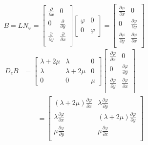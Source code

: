 \documentclass[12pt]{article}
\begin{document}
\begin{equation}		\label{eq46a}
B=LN_{\varphi}= \left[
\begin{array}{cc}
\frac{\partial}{\partial x} & 0   			\\
0 &\frac{\partial}{\partial y} 				\\
\frac{\partial}{\partial y} & \frac{\partial}{\partial x}   			\\
\end{array}
\right]
%
\left[
\begin{array}{cc}
\varphi & 0  			\\
0 &\varphi   				
\end{array}
\right]
=
 \left[
\begin{array}{cc}
\frac{\partial \varphi}{\partial x} & 0   			\\
0 &\frac{\partial \varphi}{\partial y} 				\\
\frac{\partial \varphi}{\partial y} & \frac{\partial \varphi}{\partial x}   			\\
\end{array}
\right]
\end{equation}
%
\begin{equation}	\label{eq47a}
\begin{split}
D_eB& = \left[
\begin{array}{ccc}
\lambda+2\mu & \lambda & 0 			\\
\lambda & \lambda+2\mu & 0 			\\
0 & 0 & \mu 		
\end{array}
\right]
%
 \left[
\begin{array}{cc}
\frac{\partial \varphi}{\partial x} & 0   			\\
0 &\frac{\partial \varphi}{\partial y} 				\\
\frac{\partial \varphi}{\partial y} & \frac{\partial \varphi}{\partial x}   			\\
\end{array}
\right]	\\
%
& \qquad=
\left[
\begin{array}{cc}
(\lambda+2\mu)\frac{\partial \varphi}{\partial x} & \lambda\frac{\partial \varphi}{\partial y}  			\\
\lambda\frac{\partial \varphi}{\partial x} &	(\lambda+2\mu)\frac{\partial \varphi}{\partial y} 			\\
\mu\frac{\partial \varphi}{\partial y} & \mu\frac{\partial \varphi}{\partial x}  			\\
\end{array}
\right]
\end{split}
\end{equation}
\end{document}
